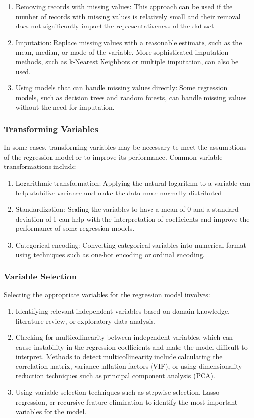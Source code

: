 \documentclass{article}
\begin{document}
\begin{enumerate}
\item Removing records with missing values: This approach can be used if the number of records with missing values is relatively small and their removal does not significantly impact the representativeness of the dataset.
\item Imputation: Replace missing values with a reasonable estimate, such as the mean, median, or mode of the variable. More sophisticated imputation methods, such as k-Nearest Neighbors or multiple imputation, can also be used.
\item Using models that can handle missing values directly: Some regression models, such as decision trees and random forests, can handle missing values without the need for imputation.
\end{enumerate}

\subsubsection{Transforming Variables}
In some cases, transforming variables may be necessary to meet the assumptions of the regression model or to improve its performance. Common variable transformations include:

\begin{enumerate}
\item Logarithmic transformation: Applying the natural logarithm to a variable can help stabilize variance and make the data more normally distributed.
\item Standardization: Scaling the variables to have a mean of 0 and a standard deviation of 1 can help with the interpretation of coefficients and improve the performance of some regression models.
\item Categorical encoding: Converting categorical variables into numerical format using techniques such as one-hot encoding or ordinal encoding.
\end{enumerate}

\subsubsection{Variable Selection}
Selecting the appropriate variables for the regression model involves:

\begin{enumerate}
\item Identifying relevant independent variables based on domain knowledge, literature review, or exploratory data analysis.
\item Checking for multicollinearity between independent variables, which can cause instability in the regression coefficients and make the model difficult to interpret. Methods to detect multicollinearity include calculating the correlation matrix, variance inflation factors (VIF), or using dimensionality reduction techniques such as principal component analysis (PCA).
\item Using variable selection techniques such as stepwise selection, Lasso regression, or recursive feature elimination to identify the most important variables for the model.
\end{enumerate}
\end{document}
